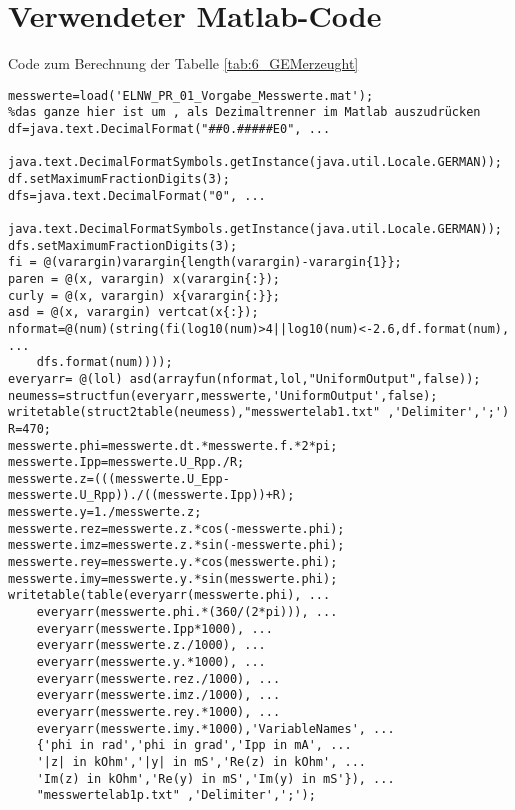 %
\section{Verwendeter Matlab-Code}
\label{app:Matlab}
%
Code zum Berechnung der Tabelle \ref{tab:6_GEMerzeught}
\begin{verbatim}
messwerte=load('ELNW_PR_01_Vorgabe_Messwerte.mat');
%das ganze hier ist um , als Dezimaltrenner im Matlab auszudrücken
df=java.text.DecimalFormat("##0.#####E0", ...
    java.text.DecimalFormatSymbols.getInstance(java.util.Locale.GERMAN));
df.setMaximumFractionDigits(3);
dfs=java.text.DecimalFormat("0", ...
    java.text.DecimalFormatSymbols.getInstance(java.util.Locale.GERMAN));
dfs.setMaximumFractionDigits(3);
fi = @(varargin)varargin{length(varargin)-varargin{1}};
paren = @(x, varargin) x(varargin{:});
curly = @(x, varargin) x{varargin{:}};
asd = @(x, varargin) vertcat(x{:});
nformat=@(num)(string(fi(log10(num)>4||log10(num)<-2.6,df.format(num), ...
    dfs.format(num))));
everyarr= @(lol) asd(arrayfun(nformat,lol,"UniformOutput",false));
neumess=structfun(everyarr,messwerte,'UniformOutput',false);
writetable(struct2table(neumess),"messwertelab1.txt" ,'Delimiter',';')
R=470;
messwerte.phi=messwerte.dt.*messwerte.f.*2*pi;
messwerte.Ipp=messwerte.U_Rpp./R;
messwerte.z=(((messwerte.U_Epp-messwerte.U_Rpp))./((messwerte.Ipp))+R);
messwerte.y=1./messwerte.z;
messwerte.rez=messwerte.z.*cos(-messwerte.phi);
messwerte.imz=messwerte.z.*sin(-messwerte.phi);
messwerte.rey=messwerte.y.*cos(messwerte.phi);
messwerte.imy=messwerte.y.*sin(messwerte.phi);
writetable(table(everyarr(messwerte.phi), ...
    everyarr(messwerte.phi.*(360/(2*pi))), ...
    everyarr(messwerte.Ipp*1000), ...
    everyarr(messwerte.z./1000), ...
    everyarr(messwerte.y.*1000), ...
    everyarr(messwerte.rez./1000), ...
    everyarr(messwerte.imz./1000), ...
    everyarr(messwerte.rey.*1000), ...
    everyarr(messwerte.imy.*1000),'VariableNames', ...
    {'phi in rad','phi in grad','Ipp in mA', ...
    '|z| in kOhm','|y| in mS','Re(z) in kOhm', ...
    'Im(z) in kOhm','Re(y) in mS','Im(y) in mS'}), ...
    "messwertelab1p.txt" ,'Delimiter',';');
\end{verbatim}
